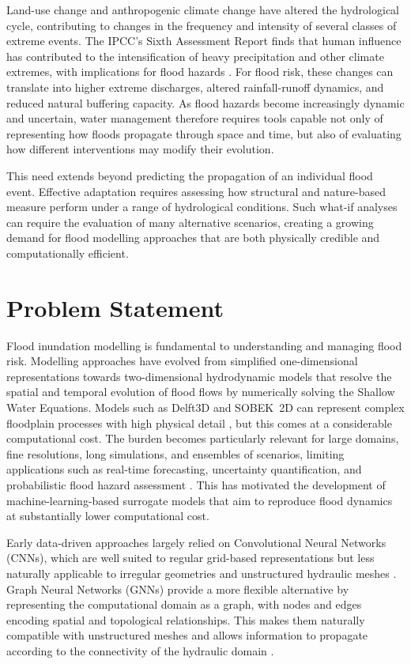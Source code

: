 \documentclass[12pt,a4paper]{report}
\begin{document}
Land-use change and anthropogenic climate change have altered the hydrological cycle, contributing to changes in the frequency and intensity of several classes of extreme events. The IPCC's Sixth Assessment Report finds that human influence has contributed to the intensification of heavy precipitation and other climate extremes, with implications for flood hazards \citep{ipcc2021ar6}. For flood risk, these changes can translate into higher extreme discharges, altered rainfall-runoff dynamics, and reduced natural buffering capacity. As flood hazards become increasingly dynamic and uncertain, water management therefore requires tools capable not only of representing how floods propagate through space and time, but also of evaluating how different interventions may modify their evolution.

This need extends beyond predicting the propagation of an individual flood event. Effective adaptation requires assessing how structural and nature-based measure perform under a range of hydrological conditions. Such what-if analyses can require the evaluation of many alternative scenarios, creating a growing demand for flood modelling approaches that are both physically credible and computationally efficient.


\section{Problem Statement}
\label{sec:statement}

Flood inundation modelling is fundamental to understanding and managing flood risk. Modelling approaches have evolved from simplified one-dimensional representations towards two-dimensional hydrodynamic models that resolve the spatial and temporal evolution of flood flows by numerically solving the Shallow Water Equations. Models such as Delft3D and SOBEK~2D can represent complex floodplain processes with high physical detail \citep{deltares2024delft3dsobek}, but this comes at a considerable computational cost. The burden becomes particularly relevant for large domains, fine resolutions, long simulations, and ensembles of scenarios, limiting applications such as real-time forecasting, uncertainty quantification, and probabilistic flood hazard assessment \citep{bentivoglio2022review,pianforini2024ensemble}. This has motivated the development of machine-learning-based surrogate models that aim to reproduce flood dynamics at substantially lower computational cost.

Early data-driven approaches largely relied on Convolutional Neural Networks (CNNs), which are well suited to regular grid-based representations but less naturally applicable to irregular geometries and unstructured hydraulic meshes \citep{bentivoglio2023swegnn,pianforini2024ensemble,taghizadeh2025hydrographnet}. Graph Neural Networks (GNNs) provide a more flexible alternative by representing the computational domain as a graph, with nodes and edges encoding spatial and topological relationships. This makes them naturally compatible with unstructured meshes and allows information to propagate according to the connectivity of the hydraulic domain \citep{bentivoglio2022review,bentivoglio2023swegnn,taghizadeh2025hydrographnet}. 
\end{document}
